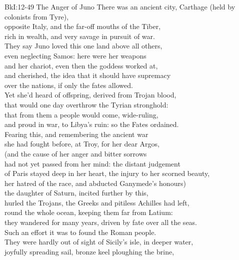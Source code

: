 \documentclass[12pt, a5paper]{minimal}
\begin{document}
{BkI:12-49 The Anger of Juno}
There was an ancient city, Carthage (held by colonists from Tyre),\\
opposite Italy, and the far-off mouths of the Tiber,\\
rich in wealth, and very savage in pursuit of war.\\
They say Juno loved this one land above all others,\\
even neglecting Samos: here were her weapons\\
and her chariot, even then the goddess worked at,\\
and cherished, the idea that it should have supremacy\\
over the nations, if only the fates allowed.\\
Yet she'd heard of offspring, derived from Trojan blood,\\
that would one day overthrow the Tyrian stronghold:\\
that from them a people would come, wide-ruling,\\
and proud in war, to Libya's ruin: so the Fates ordained.\\
Fearing this, and remembering the ancient war\\
she had fought before, at Troy, for her dear Argos,\\
(and the cause of her anger and bitter sorrows\\
had not yet passed from her mind: the distant judgement\\
of Paris stayed deep in her heart, the injury to her scorned beauty,\\
her hatred of the race, and abducted Ganymede's honours)\\
the daughter of Saturn, incited further by this,\\
hurled the Trojans, the Greeks and pitiless Achilles had left,\\
round the whole ocean, keeping them far from Latium:\\
they wandered for many years, driven by fate over all the seas.\\
Such an effort it was to found the Roman people.\\
They were hardly out of sight of Sicily's isle, in deeper water,\\
joyfully spreading sail, bronze keel ploughing the brine,\\
\end{document}
